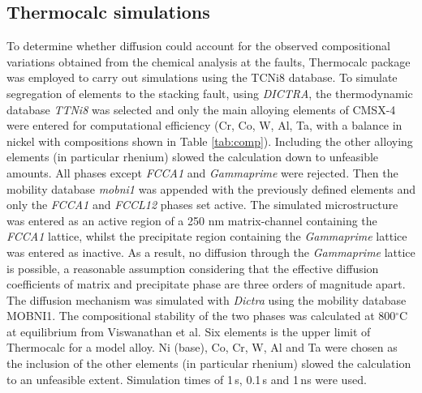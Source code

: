 \documentclass[a4paper,12pt,times,numbered,print,index]{Classes/PhDThesisPSnPDF}
\begin{document}
\subsection*{Thermocalc simulations}
To determine whether diffusion could account for the observed compositional variations obtained from the chemical analysis at the faults, Thermocalc package was employed to carry out simulations using the TCNi8 database.
To simulate segregation of elements to the stacking fault, using \textit{DICTRA}, the thermodynamic database \textit{TTNi8} was selected and only the main alloying elements of CMSX-4 were entered for computational efficiency (Cr, Co, W, Al, Ta, with a balance in nickel with compositions shown in Table \ref{tab:comp}). Including the other alloying elements (in particular rhenium) slowed the calculation down to unfeasible amounts. All phases except \textit{FCC\textunderscore A1} and \textit{Gamma\textunderscore prime} were rejected. Then the mobility database \textit{mobni1} was appended with the previously defined elements and only the \textit{FCC\textunderscore A1} and \textit{FCC\textunderscore L12} phases set active. 
The simulated microstructure was entered as an active region of a 250 nm matrix-channel containing the \textit{FCC\textunderscore A1} lattice, whilst the precipitate region containing the \textit{Gamma\textunderscore prime} lattice was entered as inactive. As a result, no diffusion through the \textit{Gamma\textunderscore prime} lattice is possible, a reasonable assumption considering that the effective diffusion coefficients of matrix and precipitate phase are three orders of magnitude apart.\\
The diffusion mechanism was simulated with \textit{Dictra} using the mobility database MOBNI1.\cite{engstrom1994computer} The compositional stability of the two phases was calculated at 800$^\circ$C at equilibrium from Viswanathan et al.\cite{viswanathan2015segregation} Six elements is the upper limit of Thermocalc for a model alloy. Ni (base), Co, Cr, W, Al and Ta were chosen as the inclusion of the other elements (in particular rhenium) slowed the calculation to an unfeasible extent. Simulation times of 1\,s, 0.1\,s and 1\,ns were used.
\end{document}
